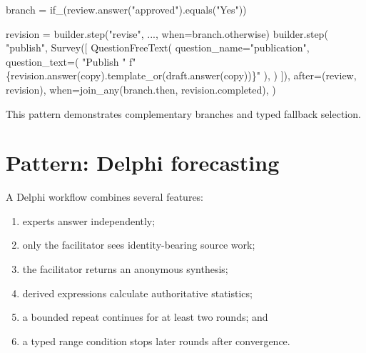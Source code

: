 \documentclass[
  10pt,
]{report}
\newenvironment{Shaded}{}{}
\newcommand{\NormalTok}[1]{#1}
\newcommand{\OperatorTok}[1]{\textcolor[rgb]{0.40,0.40,0.40}{#1}}
\newcommand{\SpecialCharTok}[1]{\textcolor[rgb]{0.25,0.44,0.63}{#1}}
\newcommand{\SpecialStringTok}[1]{\textcolor[rgb]{0.73,0.40,0.53}{#1}}
\newcommand{\StringTok}[1]{\textcolor[rgb]{0.25,0.44,0.63}{#1}}
\providecommand{\tightlist}{%
  \setlength{\itemsep}{0pt}\setlength{\parskip}{0pt}}
\begin{document}
\begin{Shaded}
\begin{Highlighting}[]
\NormalTok{branch }\OperatorTok{=}\NormalTok{ if\_(review.answer(}\StringTok{"approved"}\NormalTok{).equals(}\StringTok{"Yes"}\NormalTok{))}

\NormalTok{revision }\OperatorTok{=}\NormalTok{ builder.step(}\StringTok{"revise"}\NormalTok{, ..., when}\OperatorTok{=}\NormalTok{branch.otherwise)}
\NormalTok{builder.step(}
    \StringTok{"publish"}\NormalTok{,}
\NormalTok{    Survey([}
\NormalTok{        QuestionFreeText(}
\NormalTok{            question\_name}\OperatorTok{=}\StringTok{"publication"}\NormalTok{,}
\NormalTok{            question\_text}\OperatorTok{=}\NormalTok{(}
                \StringTok{"Publish "}
                \SpecialStringTok{f"}\SpecialCharTok{\{}\NormalTok{revision}\SpecialCharTok{.}\NormalTok{answer(}\StringTok{\textquotesingle{}copy\textquotesingle{}}\NormalTok{)}\SpecialCharTok{.}\NormalTok{template\_or(draft.answer(}\StringTok{\textquotesingle{}copy\textquotesingle{}}\NormalTok{))}\SpecialCharTok{\}}\SpecialStringTok{"}
\NormalTok{            ),}
\NormalTok{        )}
\NormalTok{    ]),}
\NormalTok{    after}\OperatorTok{=}\NormalTok{(review, revision),}
\NormalTok{    when}\OperatorTok{=}\NormalTok{join\_any(branch.then, revision.completed),}
\NormalTok{)}
\end{Highlighting}
\end{Shaded}

This pattern demonstrates complementary branches and typed fallback
selection.

\chapter{Pattern: Delphi forecasting}\label{pattern-delphi-forecasting}

A Delphi workflow combines several features:

\begin{enumerate}
\def\labelenumi{\arabic{enumi}.}
\tightlist
\item
  experts answer independently;
\item
  only the facilitator sees identity-bearing source work;
\item
  the facilitator returns an anonymous synthesis;
\item
  derived expressions calculate authoritative statistics;
\item
  a bounded repeat continues for at least two rounds; and
\item
  a typed range condition stops later rounds after convergence.
\end{enumerate}
\end{document}
